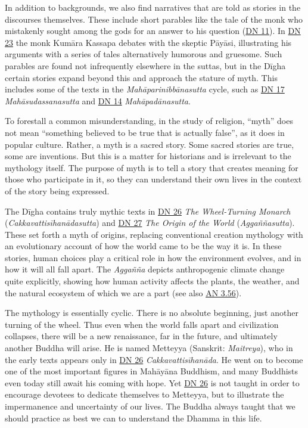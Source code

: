 \documentclass[12pt,openany]{book}%
\begin{document}
In addition to backgrounds, we also find narratives that are told as stories in the discourses themselves. These include short parables like the tale of the monk who mistakenly sought among the gods for an answer to his question (\href{https://suttacentral.net/dn11}{DN 11}). In \href{https://suttacentral.net/dn23}{DN 23} the monk \textsanskrit{Kumāra} Kassapa debates with the skeptic \textsanskrit{Pāyāsi}, illustrating his arguments with a series of tales alternatively humorous and gruesome. Such parables are found not infrequently elsewhere in the suttas, but in the \textsanskrit{Dīgha} certain stories expand beyond this and approach the stature of myth. This includes some of the texts in the \textit{\textsanskrit{Mahāparinibbānasutta}} cycle, such as \href{https://suttacentral.net/dn17}{DN 17} \textit{\textsanskrit{Mahāsudassanasutta}} and \href{https://suttacentral.net/dn14}{DN 14} \textit{\textsanskrit{Mahāpadānasutta}}.

To forestall a common misunderstanding, in the study of religion, “myth” does not mean “something believed to be true that is actually false”, as it does in popular culture. Rather, a myth is a sacred story. Some sacred stories are true, some are inventions. But this is a matter for historians and is irrelevant to the mythology itself. The purpose of myth is to tell a story that creates meaning for those who participate in it, so they can understand their own lives in the context of the story being expressed.

The \textsanskrit{Dīgha} contains truly mythic texts in \href{https://suttacentral.net/dn26}{DN 26} \textit{The Wheel-Turning Monarch} (\textit{\textsanskrit{Cakkavattisīhanādasutta}}) and \href{https://suttacentral.net/dn27}{DN 27} \textit{The Origin of the World} (\textit{\textsanskrit{Aggaññasutta}}). These set forth a myth of origins, replacing conventional creation mythology with an evolutionary account of how the world came to be the way it is. In these stories, human choices play a critical role in how the environment evolves, and in how it will all fall apart. The \textit{\textsanskrit{Aggañña}} depicts anthropogenic climate change quite explicitly, showing how human activity affects the plants, the weather, and the natural ecosystem of which we are a part (see also \href{https://suttacentral.net/an3.56}{AN 3.56}).

The mythology is essentially cyclic. There is no absolute beginning, just another turning of the wheel. Thus even when the world falls apart and civilization collapses, there will be a new renaissance, far in the future, and ultimately another Buddha will arise. He is named Metteyya (Sanskrit: \textit{Maitreya}), who in the early texts appears only in \href{https://suttacentral.net/dn26}{DN 26} \textit{\textsanskrit{Cakkavattisīhanāda}}. He went on to become one of the most important figures in \textsanskrit{Mahāyāna} Buddhism, and many Buddhists even today still await his coming with hope. Yet \href{https://suttacentral.net/dn26}{DN 26} is not taught in order to encourage devotees to dedicate themselves to Metteyya, but to illustrate the impermanence and uncertainty of our lives. The Buddha always taught that we should practice as best we can to understand the Dhamma in this life.
\end{document}
